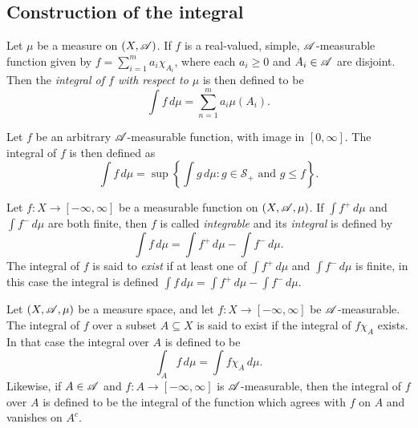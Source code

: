 \documentclass[12pt]{article}
\begin{document}
\subsection{Construction of the integral}
\begin{definition}
    Let $\mu$ be a measure on $(X,\mathscr{A})$. If $f$ is a real-valued, simple, $\mathscr{A}$-measurable function given by $f=\sum_{i=1}^m a_i \chi_{A_i}$, where each $a_i\geq0$ and $A_i\in\mathscr{A}$ are disjoint. Then the \textit{integral of $f$ with respect to $\mu$} is then defined to be
    \begin{equation*}
        \int f \,d\mu = \sum_{n=1}^m a_i \mu(A_i).
    \end{equation*}
\end{definition}
\begin{definition}
    Let $f$ be an arbitrary $\mathscr{A}$-measurable function, with image in $[0,\infty]$. The integral of $f$ is then defined as
    \begin{equation*}
        \int f \,d\mu=\sup \left\{ \int g \,d\mu : g\in \mathscr{S}_+ \text{ and } g\leq f\right\}.
    \end{equation*}
\end{definition}
\begin{definition}
    Let $f:X\to [-\infty,\infty]$ be a measurable function on $(X,\mathscr{A},\mu)$. If $\int f^+ \,d\mu$ and $\int f^- \,d\mu$ are both finite, then $f$ is called \textit{integrable} and its \textit{integral} is defined by
    \begin{equation*}
        \int f \, d\mu=\int f^+ \, d\mu -\int f^- \, d\mu.
    \end{equation*}
    The integral of $f$ is said to \textit{exist} if at least one of $\int f^+ \,d\mu$ and $\int f^- \,d\mu$ is finite, in this case the integral is defined $\int f \, d\mu=\int f^+ \, d\mu -\int f^- \, d\mu$.
\end{definition}
\begin{definition}
    Let $(X,\mathscr{A},\mu)$ be a measure space, and let $f:X\to [-\infty,\infty]$ be $\mathscr{A}$-measurable. 
    The integral of $f$ over a subset $A\subseteq X$ is said to exist if the integral of $f\chi_A$ exists. In that case the integral over $A$ is defined to be
    \begin{equation*}
        \int_A f \, d\mu=\int f\chi_A \, d\mu.
    \end{equation*}
    Likewise, if $A\in \mathscr{A}$ and $f:A\to [-\infty,\infty]$ is $\mathscr{A}$-measurable, then the integral of $f$ over $A$ is defined to be the integral of the function which agrees with $f$ on $A$ and vanishes on $A^c$.
\end{definition}
\end{document}
